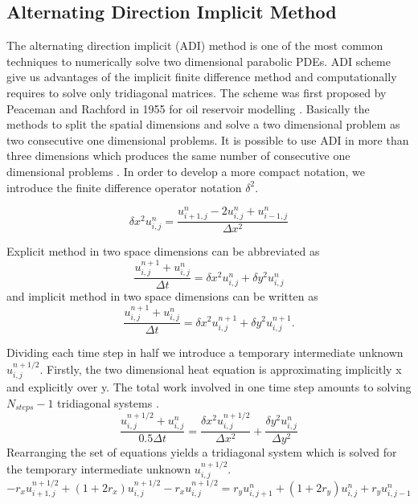 \documentclass[12pt, oneside]{book}
\theoremstyle{plain}
\theoremstyle{definition}
\begin{document}
\subsection{Alternating Direction Implicit Method}
The alternating direction implicit (ADI) method is one of the most common techniques to numerically solve two dimensional parabolic PDEs. ADI scheme give us advantages of the implicit finite difference method and computationally requires to solve only tridiagonal matrices. The scheme was first proposed by Peaceman and Rachford in 1955 for oil reservoir modelling \cite{peace}. Basically the methods to split the spatial dimensions and solve a two dimensional problem as two consecutive one dimensional problems. It is possible to use ADI in more than three dimensions which produces the same number of consecutive one dimensional problems \cite{DougADI}. In order to develop a more compact notation, we introduce the finite difference operator notation $\delta^2$.

\begin{equation}
\delta x^2 u^{n}_{i,j}  = \frac{u^{n}_{i+1,j} - 2u^{n}_{i,j} + u^{n}_{i-1,j}}{\Delta x^2}
\end{equation}

Explicit method in two space dimensions can be abbreviated as
\begin{equation}
\frac{u^{n+1}_{i,j} + u^{n}_{i,j}}{\Delta t} = \delta x^2 u^{n}_{i,j} + \delta y^2 u^{n}_{i,j}
\end{equation}
and implicit method in two space dimensions can be written as
\begin{equation}
\frac{u^{n+1}_{i,j} + u^{n}_{i,j}}{\Delta t} = \delta x^2 u^{n+1}_{i,j} + \delta y^2 u^{n+1}_{i,j} .
\end{equation}

Dividing each time step in half we introduce a temporary intermediate unknown $u^{n+1/2}_{i,j}$. Firstly, the two dimensional heat equation is approximating implicitly x and explicitly over y. The total work involved in one time step amounts to solving $ N_{steps} - 1$ tridiagonal systems \cite{morton}. 
\begin{equation}
\frac{u^{n+1/2}_{i,j} + u^{n}_{i,j}}{0.5 \Delta t} = \frac{\delta x^2 u^{n+1/2}_{i,j} }{\Delta x^2} + \frac{\delta y^2 u^{n}_{i,j}}{\Delta y^2}
\end{equation}
Rearranging the set of equations yields a tridiagonal system which is solved for the temporary intermediate unknown $u^{n+1/2}_{i,j}$.
\begin{equation}
- r_x u^{n+1/2}_{i+1,j} + (1 + 2r_x) u^{n+1/2}_{i,j}  - r_x u^{n+1/2}_{i,j}  = r_y u^{n}_{i,j+1} + (1 + 2r_y) u^{n}_{i,j} + r_y u^{n}_{i,j-1}
\end{equation}
\end{document}

